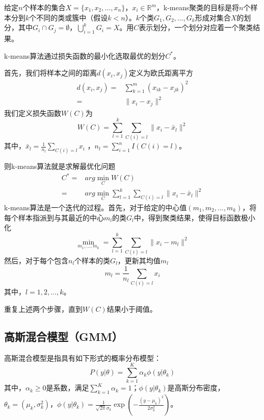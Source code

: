 \documentclass[lang=cn,11pt,a4paper,cite=authoryear]{elegantpaper}
\begin{document}
给定$n$个样本的集合$X=\{x_1, x_2,\dots,x_n\}$，$x_i\in \mathbb{R} ^m$，k-means聚类的目标是将$n$个样本分到$k$个不同的类或簇中（假设$k<n$）。$k$个类$G_1,G_2, \dots,G_k$形成对集合$X$的划分，其中$G_i\cap G_j=\emptyset$，$\bigcup\limits_{i=1}^kG_i=X$。用$C$表示划分，一个划分对应着一个聚类结果。

k-means算法通过损失函数的最小化选取最优的划分$C^*$。

首先，我们将样本之间的距离$d(x_i, x_j)$定义为欧氏距离平方
\begin{equation}
\begin{aligned}
	d(x_i,x_j)=&\sum_{k=1}^m(x_{ik}-x_{jk})^2 \\
	=&\|x_i-x_j\|^2
\end{aligned}
\end{equation}
我们定义损失函数$W(C)$为
\begin{equation}
W(C)=\sum_{l=1}^k\sum_{C(i)=l}\|x_i-\bar{x}_l\|^2
\end{equation}
其中，$\bar{x}_l=\frac{1}{n_l}\sum\limits_{C(i)=l}x_i$ ，$n_l=\sum\limits_{i=1}^nI(C(i)=l)$。

则k-means算法就是求解最优化问题
\begin{equation}
\begin{aligned}
	C^*=&arg\min_CW(C) \\
	=&arg\min_C\sum_{l=1}^k\sum_{C(i)=l}\|x_i-\bar{x}_l\|^2
\end{aligned}
\end{equation}
k-means算法是一个迭代的过程。首先，对于给定的中心值$(m_1,m_2,\dots,m_k)$，将每个样本指派到与其最近的中心$m_l$的类$G_l$中，得到聚类结果，使得目标函数极小化
\begin{equation}
\min_{m_1,\dots,m_k}=\sum_{l=1}^k\sum_{C(i)=l}\|x_i-m_l\|^2
\end{equation}
然后，对于每个包含$n_l$个样本的类$G_l$，更新其均值$m_l$
\begin{equation}
m_l=\frac{1}{n_l}\sum_{C(i)=l}x_i
\end{equation}
其中，$l=1, 2, \dots, k$。

重复上述两个步骤，直到$W(C)$结果小于阈值。

\subsection{高斯混合模型（GMM）}

高斯混合模型是指具有如下形式的概率分布模型：
\begin{equation}
P(y|\theta)=\sum_{k=1}^K\alpha_k\phi(y|\theta_k)
\end{equation}
其中，$\alpha_k\ge0$是系数，满足$\sum\limits_{k=1}^K\alpha_k=1$；$\phi(y|\theta_k)$是高斯分布密度，$\theta_k=(\mu_k,\sigma_k^2)$，$\phi(y|\theta_k)=\frac{1}{\sqrt{2\pi}\sigma_k}\exp(-\frac{(y-\mu_k)^2}{2\sigma_k^2})$。
\end{document}
